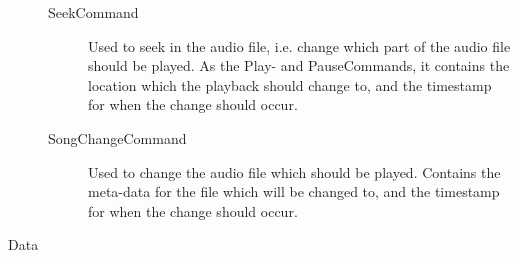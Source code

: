 \begin{description}
\begin{description}
            \item[SeekCommand]
                Used to seek in the audio file, i.e. change which part of the audio file should be played.
                As the Play- and PauseCommands, it contains the location which the playback should change to, and the timestamp for when the change should occur.
            \item[SongChangeCommand]
                Used to change the audio file which should be played.
                Contains the meta-data for the file which will be changed to, and the timestamp for when the change should occur.
        \end{description}

    \item[Data] \hfill \\

\end{description}
